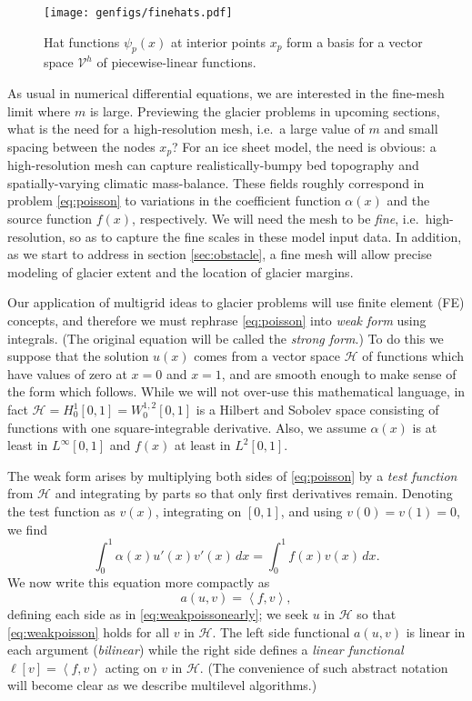 \documentclass[letterpaper,final,12pt,reqno]{amsart}
\theoremstyle{claim}
\newcommand{\ip}[2]{\left<#1,#2\right>}
\numberwithin{equation}{section}
\numberwithin{figure}{section}
\numberwithin{table}{section}
\numberwithin{theorem}{section}
\begin{document}
\begin{figure}
\texttt{[image: genfigs/finehats.pdf]}
\caption{Hat functions $\psi_p(x)$ at interior points $x_p$ form a basis for a vector space $\mathcal{V}^h$ of piecewise-linear functions.}
\label{fig:finehats}
\end{figure}

As usual in numerical differential equations, we are interested in the fine-mesh limit where $m$ is large.  Previewing the glacier problems in upcoming sections, what is the need for a high-resolution mesh, i.e.~a large value of $m$ and small spacing between the nodes $x_p$?  For an ice sheet model, the need is obvious: a high-resolution mesh can capture realistically-bumpy bed topography and spatially-varying climatic mass-balance.  These fields roughly correspond in problem \eqref{eq:poisson} to variations in the coefficient function $\alpha(x)$ and the source function $f(x)$, respectively.  We will need the mesh to be \emph{fine}, i.e.~high-resolution, so as to capture the fine scales in these model input data.  In addition, as we start to address in section \ref{sec:obstacle}, a fine mesh will allow precise modeling of glacier extent and the location of glacier margins.

Our application of multigrid ideas to glacier problems will use finite element (FE) concepts, and therefore we must rephrase \eqref{eq:poisson} into \emph{weak form} using integrals.  (The original equation will be called the \emph{strong form}.)  To do this we suppose that the solution $u(x)$ comes from a vector space $\mathcal{H}$ of functions which have values of zero at $x=0$ and $x=1$, and are smooth enough to make sense of the form which follows.  While we will not over-use this mathematical language, in fact $\mathcal{H}=H_0^1[0,1]=W_0^{1,2}[0,1]$ is a Hilbert and Sobolev space \cite[for example]{Evans2010} consisting of functions with one square-integrable derivative.  Also, we assume $\alpha(x)$ is at least in $L^\infty[0,1]$ and $f(x)$ at least in $L^2[0,1]$.

The weak form arises by multiplying both sides of \eqref{eq:poisson} by a \emph{test function} from $\mathcal{H}$ and integrating by parts so that only first derivatives remain.  Denoting the test function as $v(x)$, integrating on $[0,1]$, and using $v(0)=v(1)=0$, we find
\begin{equation}
\int_0^1 \alpha(x) u'(x) v'(x)\,dx = \int_0^1 f(x) v(x)\, dx.  \label{eq:weakpoissonearly}
\end{equation}
We now write this equation more compactly as
\begin{equation}
  a(u,v) = \ip{f}{v}, \label{eq:weakpoisson}
\end{equation}
defining each side as in \eqref{eq:weakpoissonearly}; we seek $u$ in $\mathcal{H}$ so that \eqref{eq:weakpoisson} holds for all $v$ in $\mathcal{H}$.  The left side functional $a(u,v)$ is linear in each argument (\emph{bilinear}) while the right side defines a \emph{linear functional} $\ell[v] = \ip{f}{v}$ acting on $v$ in $\mathcal{H}$.  (The convenience of such abstract notation will become clear as we describe multilevel algorithms.)
\end{document}
